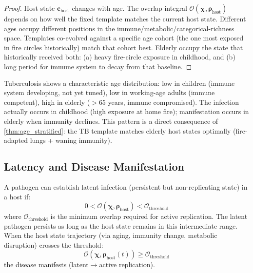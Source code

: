 \documentclass[11pt,twocolumn,a4paper]{article}
\newcommand{\Template}{\boldsymbol{\chi}}
\newcommand{\State}{\boldsymbol{\rho}}
\newcommand{\Overlap}{\mathcal{O}}
\begin{document}
\begin{proof}
Host state $\mathbf{c}_{\mathrm{host}}$ changes with age. The overlap integral $\Overlap(\Template, \State_{\mathrm{host}})$ depends on how well the fixed template matches the current host state. Different ages occupy different positions in the immune/metabolic/categorical-richness space. Templates co-evolved against a specific age cohort (the one most exposed in fire circles historically) match that cohort best. Elderly occupy the state that historically received both: (a) heavy fire-circle exposure in childhood, and (b) long period for immune system to decay from that baseline.
\end{proof}

\begin{example}
Tuberculosis shows a characteristic age distribution: low in children (immune system developing, not yet tuned), low in working-age adults (immune competent), high in elderly ($>65$ years, immune compromised). The infection actually occurs in childhood (high exposure at home fire); manifestation occurs in elderly when immunity declines. This pattern is a direct consequence of \cref{thm:age_stratified}: the TB template matches elderly host states optimally (fire-adapted lungs + waning immunity).
\end{example}

\subsection{Latency and Disease Manifestation}

\begin{theorem}
\label{thm:latency}
A pathogen can establish latent infection (persistent but non-replicating state) in a host if:
\begin{equation}
0 < \Overlap(\Template, \State_{\mathrm{host}}) < \Overlap_{\mathrm{threshold}}
\label{eq:latency_condition}
\end{equation}
where $\Overlap_{\mathrm{threshold}}$ is the minimum overlap required for active replication. The latent pathogen persists as long as the host state remains in this intermediate range. When the host state trajectory (via aging, immunity change, metabolic disruption) crosses the threshold:
\begin{equation}
\Overlap(\Template, \State_{\mathrm{host}}(t)) \ge \Overlap_{\mathrm{threshold}}
\label{eq:reactivation_condition}
\end{equation}
the disease manifests (latent$\to$active replication).
\end{theorem}
\end{document}
